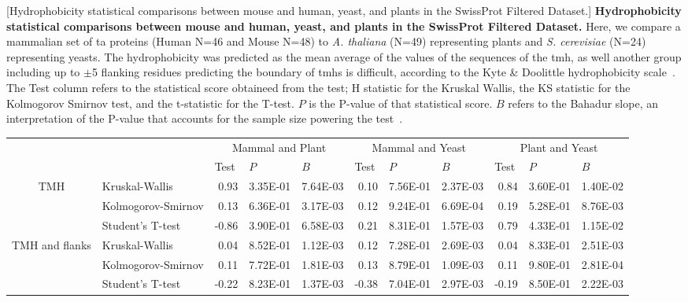 \begin{table}[htbp]
\centering
{}[Hydrophobicity statistical comparisons between mouse and human, yeast, and plants in the SwissProt Filtered Dataset.]
{\textbf{Hydrophobicity statistical comparisons between mouse and human, yeast, and plants in the SwissProt Filtered Dataset.}
Here, we compare a mammalian set of \gls{ta} proteins (Human N=46 and Mouse N=48) to \textit{A. thaliana} (N=49) representing plants  and  \textit{S. cerevisiae} (N=24) representing yeasts.
The hydrophobicity was predicted as the mean average of the values of the sequences of the \gls{tmh}, as well another group including up to $\pm$5 flanking residues predicting the boundary of \gls{tmh}s is difficult, according to the Kyte \& Doolittle hydrophobicity scale~\cite{Kyte1982}.
The Test column refers to the statistical score obtaineed from the test; H statistic for the Kruskal Wallis, the KS statistic for the Kolmogorov Smirnov test, and the t-statistic for the T-test.
$P$ is the P-value of that statistical score.
$B$ refers to the Bahadur slope, an interpretation of the P-value that accounts for the sample size powering the test~\cite{Bahadur1967, Bahadur1971}.}
\tiny

    \begin{tabular}{clrrrrrrrrr}
          &       & \multicolumn{3}{c}{Mammal and Plant} & \multicolumn{3}{c}{Mammal and Yeast} & \multicolumn{3}{c}{Plant and Yeast} \\
          &       & \multicolumn{1}{l}{ Test} & \multicolumn{1}{l}{ $P$} & \multicolumn{1}{l}{ $B$} & \multicolumn{1}{l}{ Test} & \multicolumn{1}{l}{ $P$} & \multicolumn{1}{l}{ $B$} & \multicolumn{1}{l}{ Test} & \multicolumn{1}{l}{ $P$} & \multicolumn{1}{l}{ $B$} \\
    \multirow{3}[0]{*}{TMH } &  Kruskal-Wallis & 0.93  & 3.35E-01 & 7.64E-03 & 0.10  & 7.56E-01 & 2.37E-03 & 0.84  & 3.60E-01 & 1.40E-02 \\
          &  Kolmogorov-Smirnov & 0.13  & 6.36E-01 & 3.17E-03 & 0.12  & 9.24E-01 & 6.69E-04 & 0.19  & 5.28E-01 & 8.76E-03 \\
          &  Student's T-test & -0.86 & 3.90E-01 & 6.58E-03 & 0.21  & 8.31E-01 & 1.57E-03 & 0.79  & 4.33E-01 & 1.15E-02 \\
    \multirow{3}[0]{*}{TMH and flanks } &  Kruskal-Wallis & 0.04  & 8.52E-01 & 1.12E-03 & 0.12  & 7.28E-01 & 2.69E-03 & 0.04  & 8.33E-01 & 2.51E-03 \\
          &  Kolmogorov-Smirnov & 0.11  & 7.72E-01 & 1.81E-03 & 0.13  & 8.79E-01 & 1.09E-03 & 0.11  & 9.80E-01 & 2.81E-04 \\
          &  Student's T-test & -0.22 & 8.23E-01 & 1.37E-03 & -0.38 & 7.04E-01 & 2.97E-03 & -0.19 & 8.50E-01 & 2.22E-03 \\
    \end{tabular}%
				\label{table:speciestableswissprotstats}

\end{table}%

